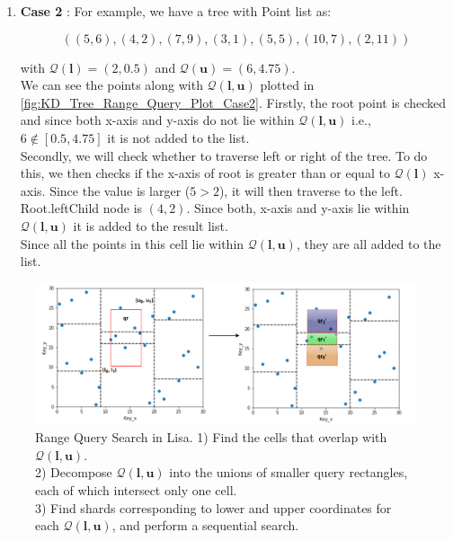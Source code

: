 \begin{mscexample}
\begin{enumerate}
	 \item\textbf{Case 2} : For example, we have a tree with Point list as: 

	$$((5,6),(4,2),(7,9),(3,1),(5,5),(10,7),(2,11))$$
	
	with $\mathcal{Q}(\boldsymbol{l}) = (2,0.5)$ and $\mathcal{Q}(\boldsymbol{u}) = (6,4.75)$. \\
	We can see the points along with $\mathcal{Q}(\boldsymbol{l}, \boldsymbol{u})$ plotted in \ref{fig:KD_Tree_Range_Query_Plot_Case2}.
	Firstly, the root point is checked and since both x-axis and y-axis do not lie within $\mathcal{Q}(\boldsymbol{l}, \boldsymbol{u})$ i.e., $6 \notin [0.5, 4.75]$ it is not added to the list.\\
	Secondly, we will check whether to traverse left or right of the tree. To do this, we then checks if the x-axis of root is greater than or equal to $\mathcal{Q}(\boldsymbol{l})$ x-axis. Since the value is larger ($5 > 2$), it will then traverse to the left. Root.leftChild node is $(4,2)$. Since both, x-axis and y-axis lie within $\mathcal{Q}(\boldsymbol{l}, \boldsymbol{u})$ it is added to the result list. \\  Since all the points in this cell lie within $\mathcal{Q}(\boldsymbol{l}, \boldsymbol{u})$, they are all added to the list.
\end{enumerate}
\end{mscexample}

\begin{figure}[t]
    \centering
    \includegraphics[width=1\textwidth]{graphs/range_query_lisa.png}
    \caption{Range Query Search in Lisa.
    1) Find the cells that overlap with $\mathcal{Q}(\boldsymbol{l}, \boldsymbol{u})$. \\
    2) Decompose $\mathcal{Q}(\boldsymbol{l}, \boldsymbol{u})$ into the unions of smaller query rectangles, each of which intersect only one cell. \\
    3) Find shards corresponding to lower and upper coordinates for each $\mathcal{Q}(\boldsymbol{l}, \boldsymbol{u})$, and perform a sequential search. }
    \label{fig:Range_Query_Lisa}
\end{figure}


